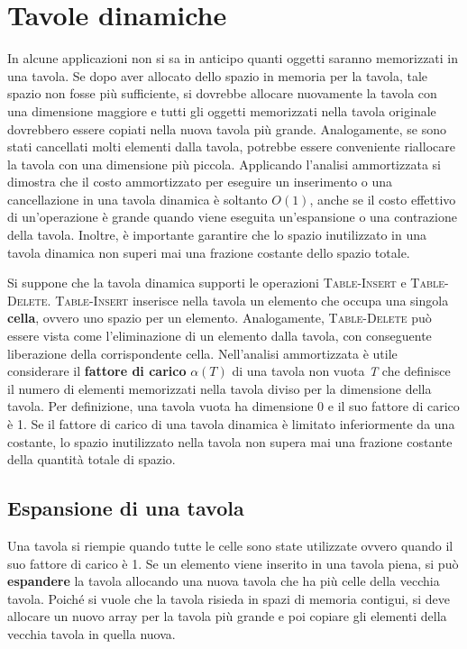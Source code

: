\documentclass[10pt, a4paper]{report}
\begin{document}
\section{Tavole dinamiche}
In alcune applicazioni non si sa in anticipo quanti oggetti saranno memorizzati in una tavola. Se dopo aver allocato dello spazio in memoria per la tavola, tale spazio non fosse più sufficiente, si dovrebbe allocare nuovamente la tavola con una dimensione maggiore e tutti gli oggetti memorizzati nella tavola originale dovrebbero essere copiati nella nuova tavola più grande. Analogamente, se sono stati cancellati molti elementi dalla tavola, potrebbe essere conveniente riallocare la tavola con una dimensione più piccola. Applicando l'analisi ammortizzata si dimostra che il costo ammortizzato per eseguire un inserimento o una cancellazione in una tavola dinamica è soltanto $O(1)$, anche se il costo effettivo di un'operazione è grande quando viene eseguita un'espansione o una contrazione della tavola. Inoltre, è importante garantire che lo spazio inutilizzato in una tavola dinamica non superi mai una frazione costante dello spazio totale.

Si suppone che la tavola dinamica supporti le operazioni \textsc{Table-Insert} e \textsc{Table-Delete}. \textsc{Table-Insert} inserisce nella tavola un elemento che occupa una singola \textbf{cella}, ovvero uno spazio per un elemento. Analogamente, \textsc{Table-Delete} può essere vista come l'eliminazione di un elemento dalla tavola, con conseguente liberazione della corrispondente cella. Nell'analisi ammortizzata è utile considerare il \textbf{fattore di carico} $\alpha(T)$ di una tavola non vuota \textit{T} che definisce il numero di elementi memorizzati nella tavola diviso per la dimensione della tavola. Per definizione, una tavola vuota ha dimensione 0 e il suo fattore di carico è 1. Se il fattore di carico di una tavola dinamica è limitato inferiormente da una costante, lo spazio inutilizzato nella tavola non supera mai una frazione costante della quantità totale di spazio.
\subsection{Espansione di una tavola}
Una tavola si riempie quando tutte le celle sono state utilizzate ovvero quando il suo fattore di carico è 1. Se un elemento viene inserito in una tavola piena, si può \textbf{espandere} la tavola allocando una nuova tavola che ha più celle della vecchia tavola. Poiché si vuole che la tavola risieda in spazi di memoria contigui, si deve allocare un nuovo array per la tavola più grande e poi copiare gli elementi della vecchia tavola in quella nuova.
\end{document}
